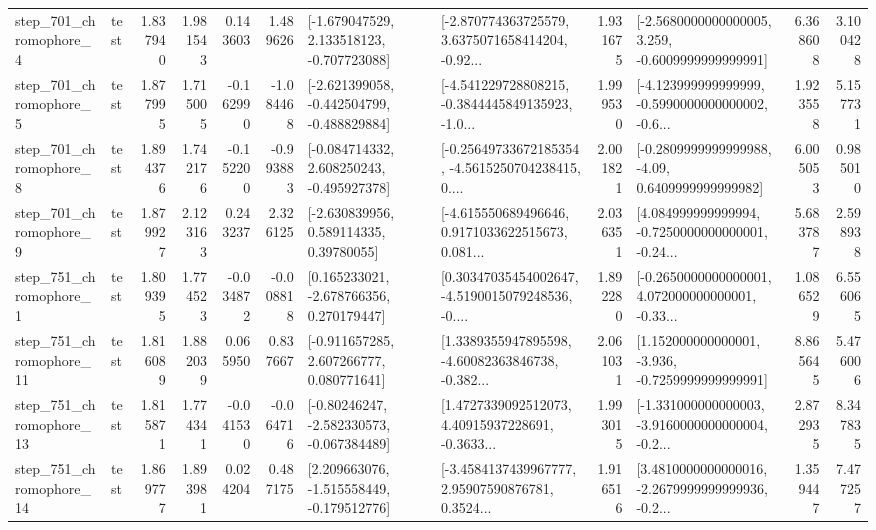 \begin{tabular}{llrrrrllrlrr}
   step\_701\_chromophore\_4 &      test &      1.837940 &    1.981543 &      0.143603 &  1.489626 &   [-1.679047529, 2.133518123, -0.707723088] &  [-2.870774363725579, 3.6375071658414204, -0.92... &       1.931675 &  [-2.5680000000000005, 3.259, -0.6009999999999991] &            6.368608 &          3.100428 \\
   step\_701\_chromophore\_5 &      test &      1.877995 &    1.715005 &     -0.162990 & -1.084468 &  [-2.621399058, -0.442504799, -0.488829884] &  [-4.541229728808215, -0.3844445849135923, -1.0... &       1.999530 &  [-4.123999999999999, -0.5990000000000002, -0.6... &            1.923558 &          5.157731 \\
   step\_701\_chromophore\_8 &      test &      1.894376 &    1.742176 &     -0.152200 & -0.993883 &   [-0.084714332, 2.608250243, -0.495927378] &  [-0.25649733672185354, -4.5615250704238415, 0.... &       2.001821 &   [-0.2809999999999988, -4.09, 0.6409999999999982] &            6.005053 &          0.985010 \\
   step\_701\_chromophore\_9 &      test &      1.879927 &    2.123163 &      0.243237 &  2.326125 &     [-2.630839956, 0.589114335, 0.39780055] &  [-4.615550689496646, 0.9171033622515673, 0.081... &       2.036351 &  [4.084999999999994, -0.7250000000000001, -0.24... &            5.683787 &          2.598938 \\
   step\_751\_chromophore\_1 &      test &      1.809395 &    1.774523 &     -0.034872 & -0.008818 &    [0.165233021, -2.678766356, 0.270179447] &  [0.30347035454002647, -4.5190015079248536, -0.... &       1.892280 &  [-0.2650000000000001, 4.072000000000001, -0.33... &            1.086529 &          6.556065 \\
  step\_751\_chromophore\_11 &      test &      1.816089 &    1.882039 &      0.065950 &  0.837667 &    [-0.911657285, 2.607266777, 0.080771641] &  [1.3389355947895598, -4.60082363846738, -0.382... &       2.061031 &   [1.152000000000001, -3.936, -0.7259999999999991] &            8.865645 &          5.476006 \\
  step\_751\_chromophore\_13 &      test &      1.815871 &    1.774341 &     -0.041530 & -0.064716 &   [-0.80246247, -2.582330573, -0.067384489] &  [1.4727339092512073, 4.40915937228691, -0.3633... &       1.993015 &  [-1.331000000000003, -3.9160000000000004, -0.2... &            2.872935 &          8.347835 \\
  step\_751\_chromophore\_14 &      test &      1.869777 &    1.893981 &      0.024204 &  0.487175 &   [2.209663076, -1.515558449, -0.179512776] &  [-3.4584137439967777, 2.95907590876781, 0.3524... &       1.916516 &  [3.4810000000000016, -2.2679999999999936, -0.2... &            1.359447 &          7.477257 \\

\end{tabular}
